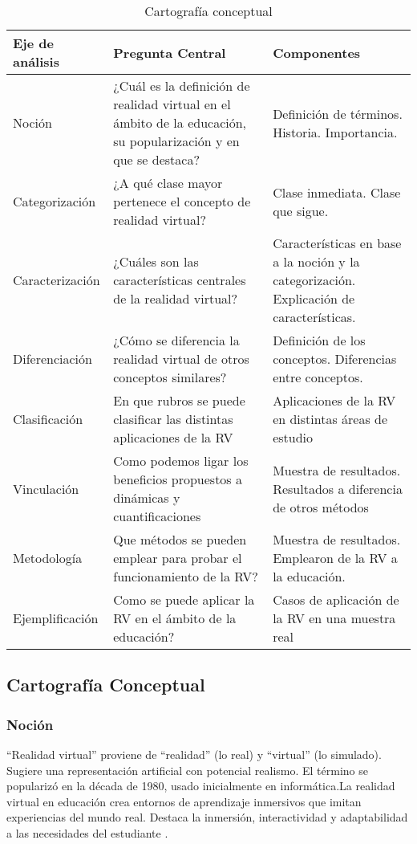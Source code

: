 \begin{table}[!h]
   \caption{Cartografía conceptual}
   \begin{tabular}{p{3.5cm}|p{4.5cm}|p{4.2cm}}
      Eje de análisis & Pregunta Central & Componentes\\
      \hline
      Noción & ¿Cuál es la definición de realidad virtual en el ámbito de la educación, su popularización y en que se destaca? & Definición de términos. Historia. Importancia.\\
      Categorización & ¿A qué clase mayor pertenece el concepto de realidad virtual? & Clase inmediata. Clase que sigue.\\
      Caracterización & ¿Cuáles son las características centrales de la realidad virtual? & Características en base a la noción y la categorización. Explicación de características.\\
      Diferenciación & ¿Cómo se diferencia la realidad virtual de otros conceptos similares? & Definición de los conceptos. Diferencias entre conceptos.\\
      Clasificación & En que rubros se puede clasificar las distintas aplicaciones de la RV & Aplicaciones de la RV en distintas áreas de estudio\\
      Vinculación & Como podemos ligar los beneficios propuestos a dinámicas y cuantificaciones& Muestra de resultados. Resultados a diferencia de otros métodos\\
      Metodología & Que métodos se pueden emplear para probar el funcionamiento de la RV?& Muestra de resultados. Emplearon de la RV a la educación.\\
      Ejemplificación & Como se puede aplicar la RV en el ámbito de la educación? & Casos de aplicación de la RV en una muestra real\\
   \end{tabular}
\end{table}

\subsection{Cartografía Conceptual}

\subsubsection{Noción}

“Realidad virtual” proviene de “realidad” (lo real) y “virtual” (lo simulado). Sugiere una representación artificial con potencial realismo. El término se popularizó en la década de 1980, usado inicialmente en informática.La realidad virtual en educación crea entornos de aprendizaje inmersivos que imitan experiencias del mundo real. Destaca la inmersión, interactividad y adaptabilidad a las necesidades del estudiante \parencite{zheng1998virtual}.

